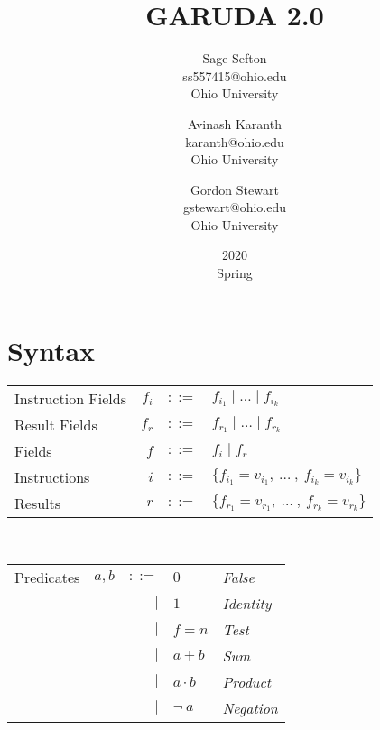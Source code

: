 \documentclass[12pt, letterpaper]{article}
\def \sysname {\textsc{GARUDA 2.0}}
\begin{document}
  \title{\sysname}
  \date{2020\\ Spring}

  \author{
    Sage Sefton \\
    ss557415@ohio.edu \\
    Ohio University \\
    \and
    Avinash Karanth  \\
    karanth@ohio.edu \\
    Ohio University  \\
    \and
    Gordon Stewart \\
    gstewart@ohio.edu \\
    Ohio University
  }

  \maketitle

\cleardoublepage
\section{Syntax}

  \begin{tabular}{l r c l}
    Instruction Fields   & $f_{i}$   & $::=$     & $f_{i_{1}} \mid \dots \mid f_{i_{k}}$\\
    Result Fields        & $f_{r}$   & $::=$     & $f_{r_{1}} \mid \dots \mid f_{r_{k}}$\\
    Fields               & $f$       & $::=$     & $f_i \mid f_r$ \\
    Instructions         & $i$       & $::=$     & $\{f_{i_{1}} = v_{i_{1}} ,\ \dots\ ,\ f_{i_{k}} = v_{i_{k}}\}$\\
    Results              & $r$       & $::=$     & $\{f_{r_{1}} = v_{r_{1}} ,\ \dots\ ,\ f_{r_{k}} = v_{r_{k}}\}$\\
  \end{tabular}\\

  \begin{tabular}{l c r l l}
    Predicates  & $a,b$     & $::=$  & $0$          & \textit{False} \\
                &           & $\mid$ & $1$          & \textit{Identity}    \\
                &           & $\mid$ & $f=n$        & \textit{Test} \\  
                &           & $\mid$ & $a + b$      & \textit{Sum}      \\
                &           & $\mid$ & $a \cdot b$  & \textit{Product}  \\
                &           & $\mid$ & $\neg \ a$   & \textit{Negation}
  \end{tabular}\\
\end{document}
